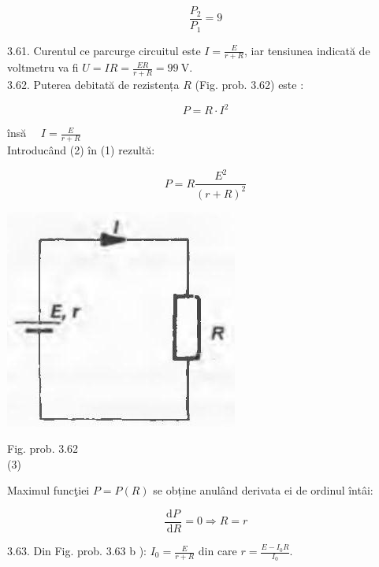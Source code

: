 \documentclass[10pt]{article}
\begin{document}
$$
\frac{P_{2}}{P_{1}}=9
$$

3.61. Curentul ce parcurge circuitul este $I=\frac{E}{r+R}$, iar tensiunea indicată de voltmetru va fi $U=I R=\frac{E R}{r+R}=99 \mathrm{~V}$.\\
3.62. Puterea debitată de rezistența $R$ (Fig. prob. 3.62) este :


\begin{equation*}
P=R \cdot I^{2} \tag{1}
\end{equation*}


însă $\quad I=\frac{E}{r+R}$\\
Introducând (2) în (1) rezultă:

$$
P=R \frac{E^{2}}{(r+R)^{2}}
$$

\begin{center}
\includegraphics[max width=\textwidth]{2025_07_01_5b3ff9fa0d508c8e9f17g-353(2)}
\end{center}

Fig. prob. 3.62\\
(3)

Maximul funcţiei $P=P(R)$ se obține anulând derivata ei de ordinul întâi:

$$
\frac{\mathrm{d} P}{\mathrm{~d} R}=0 \Rightarrow R=r
$$

3.63. Din Fig. prob. 3.63 b ): $I_{0}=\frac{E}{r+R}$ din care $r=\frac{E-I_{0} R}{I_{0}}$.
\end{document}

